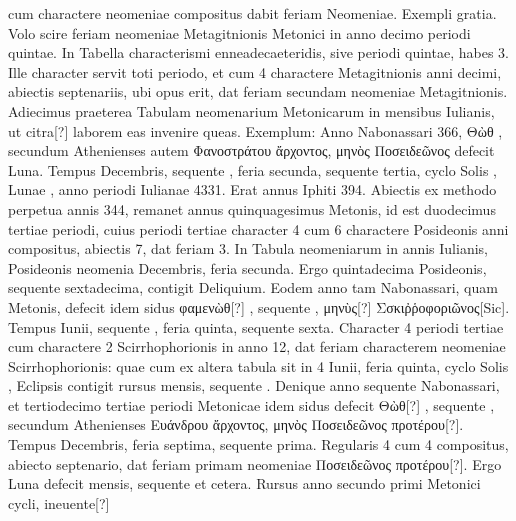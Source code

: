 cum charactere neomeniae compositus dabit feriam
Neomeniae.
%
Exempli gratia.
Volo scire feriam neomeniae Metagitnionis
Metonici in anno decimo periodi quintae.
In Tabella
characterismi enneadecaeteridis, sive periodi quintae, habes
3.
Ille character servit toti periodo, et cum 4 charactere Metagitnionis
anni decimi, abiectis septenariis, ubi opus erit, dat
feriam secundam neomeniae Metagitnionis.
Adiecimus praeterea
Tabulam neomenarium Metonicarum in mensibus Iulianis,
ut citra[?] laborem eas invenire queas.
Exemplum: Anno
Nabonassari 366, \textgreek{Θὼθ },
 secundum Athenienses autem \textgreek{Φανοστράτου
ἄρχοντος, μηνὸς Ποσειδεῶνος} defecit Luna.
Tempus
 Decembris, sequente , feria secunda, sequente
tertia, cyclo Solis , Lunae , anno periodi Iulianae
4331.
Erat annus Iphiti 394.
Abiectis ex methodo perpetua annis
344, remanet annus quinquagesimus Metonis, id est duodecimus
tertiae periodi, cuius periodi tertiae character 4 cum 6 charactere
Posideonis anni  compositus, abiectis 7, dat feriam 3.
%
In Tabula neomeniarum in annis Iulianis, Posideonis neomenia 
Decembris, feria secunda.
Ergo quintadecima Posideonis, sequente
sextadecima, contigit Deliquium.
Eodem anno tam Nabonassari,
quam Metonis, defecit idem
 sidus \textgreek{φαμενὼθ[?] },
 sequente \textgreek{}, \textgreek{μηνὺς[?]}
\textgreek{Σσκιῤῥοφοριῶνος[Sic]}.
Tempus  Iunii, sequente , feria quinta,
sequente sexta.
Character 4 periodi tertiae cum charactere
2 Scirrhophorionis in anno 12, dat feriam  characterem neomeniae
Scirrhophorionis: quae cum ex altera tabula sit in 4 Iunii, feria
quinta, cyclo Solis , Eclipsis contigit rursus  mensis, 
 sequente
.
Denique anno sequente Nabonassari, et tertiodecimo
tertiae periodi Metonicae idem sidus defecit
 \textgreek{Θὼθ[?] }, sequente
\textgreek{}, secundum Athenienses
 \textgreek{Ευάνδρου ἄρχοντος, μηνὸς Ποσειδεῶνος προτέρου[?]}.
Tempus  Decembris, feria septima, sequente prima.
Regularis
4 cum 4 compositus, abiecto septenario, dat feriam primam
neomeniae \textgreek{Ποσειδεῶνος προτέρου[?]}.
Ergo Luna defecit  mensis, sequente
 et cetera.
Rursus anno secundo primi Metonici cycli, ineuente[?]
